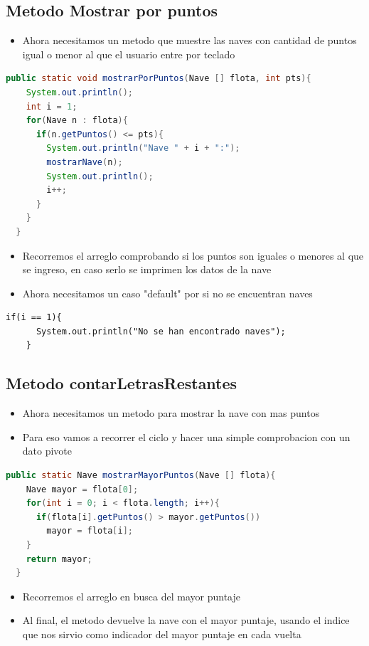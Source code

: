 \documentclass{article}
\begin{document}
        \subsection{Metodo Mostrar por puntos}
        \begin{itemize}
            \item Ahora necesitamos un metodo que muestre las naves con cantidad de puntos igual o menor al que el usuario entre por teclado
        \end{itemize}
        \begin{lstlisting}[language=java, caption={Implementacion del metodo mostrar por puntos}]
  public static void mostrarPorPuntos(Nave [] flota, int pts){
    System.out.println();
    int i = 1;
    for(Nave n : flota){
      if(n.getPuntos() <= pts){
        System.out.println("Nave " + i + ":");
        mostrarNave(n);
        System.out.println();
        i++;
      }
    }  
  }
        \end{lstlisting}
        \begin{itemize}
            \item Recorremos el arreglo comprobando si los puntos son iguales o menores al que se ingreso, en caso serlo se imprimen los datos de la nave
            \item Ahora necesitamos un caso "default" por si no se encuentran naves
        \end{itemize}
        \begin{lstlisting}[caption={Condicion de default}]
    if(i == 1){
      System.out.println("No se han encontrado naves");
    } 
        \end{lstlisting}

        \subsection{Metodo contarLetrasRestantes}
        \begin{itemize}
            \item Ahora necesitamos un metodo para mostrar la nave con mas puntos
            \item Para eso vamos a recorrer el ciclo y hacer una simple comprobacion con un dato pivote
        \end{itemize}
            \begin{lstlisting}[language=java, caption={Metodo Mostrar Mayor Puntos}]
  public static Nave mostrarMayorPuntos(Nave [] flota){
    Nave mayor = flota[0];
    for(int i = 0; i < flota.length; i++){
      if(flota[i].getPuntos() > mayor.getPuntos())
        mayor = flota[i];
    }
    return mayor;
  }
            \end{lstlisting}
        \begin{itemize}
            \item Recorremos el arreglo en busca del mayor puntaje
            \item Al final, el metodo devuelve la nave con el mayor puntaje, usando el indice que nos sirvio como indicador del mayor puntaje en cada vuelta
            
        \end{itemize}
        
\end{document}
